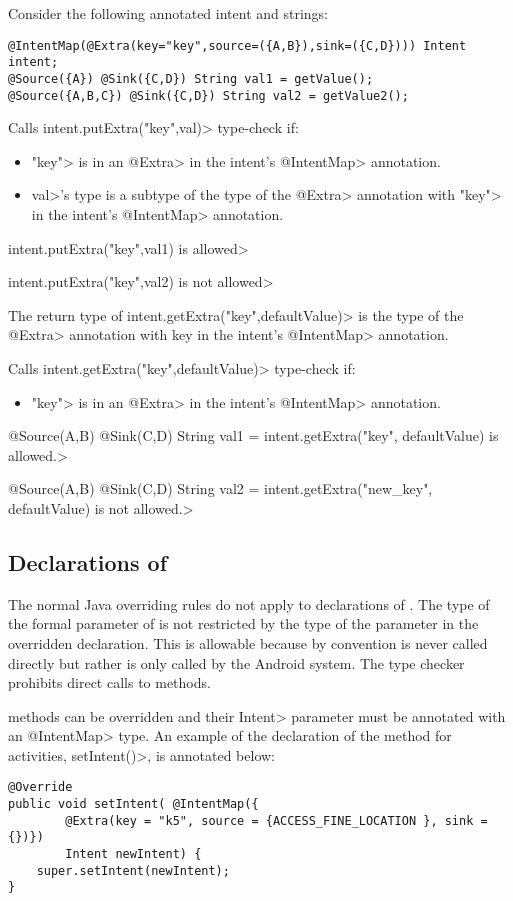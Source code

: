 Consider the following annotated intent and strings:

\begin{Verbatim}
@IntentMap(@Extra(key="key",source=({A,B}),sink=({C,D}))) Intent intent;
@Source({A}) @Sink({C,D}) String val1 = getValue();
@Source({A,B,C}) @Sink({C,D}) String val2 = getValue2();
\end{Verbatim}

Calls \<intent.putExtra("key",val)> type-check if:
\begin{itemize}
\item
 \<"key"> is in an \<@Extra> in the intent's \<@IntentMap> annotation.
\item
 \<val>'s type is a subtype of the type of the \<@Extra> annotation with 
 \<"key"> in the intent's \<@IntentMap> annotation. 
\end{itemize}

\noindent
\<intent.putExtra("key",val1) is allowed>

\noindent
\<intent.putExtra("key",val2) is not allowed>

\vspace{1mm}
The return type of \<intent.getExtra("key",defaultValue)> is the type of the
\<@Extra> annotation with key in the intent's \<@IntentMap> annotation.

Calls \<intent.getExtra("key",defaultValue)> type-check if:
\begin{itemize}
\item
\<"key"> is in an \<@Extra> in the intent's \<@IntentMap> annotation.

\end{itemize}

\noindent
\<@Source({A,B}) @Sink({C,D}) String val1 = intent.getExtra("key",
    defaultValue) is allowed.>

\noindent
\<@Source({A,B}) @Sink({C,D}) String val2 = intent.getExtra("new\_key",
    defaultValue) is not allowed.>


\subsection{Declarations of \onReceive{}}
The normal Java overriding rules do not apply to declarations of \onReceive{}. The
type of the formal parameter of \onReceive{} is not restricted by the type of the
parameter in the overridden declaration. This is allowable because by convention
\onReceive{} is never called directly but rather is only called by the Android
system. The type checker prohibits direct calls to \onReceive{} methods.

\onReceive{} methods can be overridden and their \<Intent> parameter must be
annotated with an \<@IntentMap> type. An example of the declaration of the 
\onReceive{} method for activities, \<setIntent()>, is annotated below:

\begin{Verbatim}
@Override
public void setIntent( @IntentMap({
        @Extra(key = "k5", source = {ACCESS_FINE_LOCATION }, sink = {})})
        Intent newIntent) {
    super.setIntent(newIntent);
}
\end{Verbatim}

